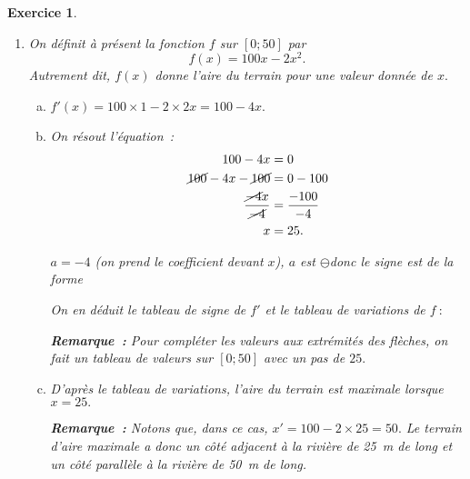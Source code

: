 \documentclass[10pt]{article}
\newtheorem{exo}{Exercice}
\begin{document}
\begin{exo}
\begin{enumerate}
\begin{enumerate}[(a)]
Conclusion~: on a l'encadrement \[0\leq x\leq 50.\]
\item Le périmètre, 100~m, s'obtient en faisant le calcul
\[x+x+x',\]
donc \[2x+x'=100~;\]
et donc
\[x'=100-2x.\]
\item L’aire du terrain est \begin{align*}x\times x'&=x\times \left(100-2x\right)&& \text{(car } x'=100-2x)\\
&=x\times 100+x\times (-2x)&&\text{(on développe)}\\
&=100x-2x^2.&&\end{align*}
\end{enumerate}
\item On définit à présent la fonction $f$  sur $\left[0;50\right]$ par 
\[f(x)=100x-2x^2.\]
Autrement dit, $f(x)$ donne l'aire du terrain pour une valeur donnée de $x.$
\begin{enumerate}[(a)] \item $f'(x)=100\times 1-2\times 2x=100-4x.$
\item On résout l'équation~:
\begin{align*}100-4x&=0\\
 \cancel{100}-4x-\cancel{100}&=0-100\\
 \frac{\cancel{-4}x}{\cancel{-4}}&=\frac{-100}{-4}\\
 x&=25.
 \end{align*}

$a=-4$ (\danger on prend le coefficient devant $x$), $a$ est \Large $\ominus$\normalsize donc le signe est de la forme \fbox{$+~\upphi~-$}

\medskip


On en déduit le tableau de signe de $f'$ et le tableau de variations de $f~:$


\medskip

\begin{center}
\end{center}

\medskip

\textbf{Remarque~:} Pour compléter les valeurs aux extrémités des flèches, on fait un tableau de valeurs sur $\left[0;50\right]$ avec un pas de $25.$
\item D'après le tableau de variations, l'aire du terrain est maximale lorsque $x=25.$ 

\medskip

\textbf{Remarque~:} Notons que, dans ce cas, $x'=100-2\times 25=50.$ Le terrain d'aire maximale a donc un côté adjacent à la rivière de 25~m de long et un côté parallèle à la rivière de 50~m de long.
\end{enumerate}
\end{enumerate}

\end{exo}
\end{document}
